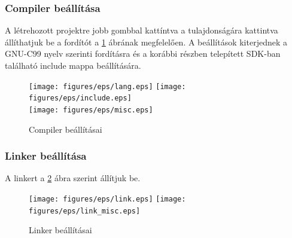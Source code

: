 \subsubsection*{Compiler beállítása}
	A létrehozott projektre jobb gombbal kattíntva a tulajdonságára kattintva állíthatjuk be a fordítót a \ref{fig:compiler} ábrának
	megfelelően.
	A beállítások kiterjednek a GNU-C99 nyelv szerinti fordításra és a korábbi részben telepített SDK-ban található include mappa
	beállítására.
	\begin{figure}[!h]
	\centering
		\texttt{[image: figures/eps/lang.eps]}\hspace{1cm}
		\texttt{[image: figures/eps/include.eps]}\\\vspace{5mm}
		\texttt{[image: figures/eps/misc.eps]}
	\caption{Compiler beállításai} 
	\label{fig:compiler}
	\end{figure}

\subsubsection*{Linker beállítása}
	A linkert a \ref{fig:linker} ábra szerint állítjuk be.
	\begin{figure}[!h]
	\centering
		\texttt{[image: figures/eps/link.eps]}\hspace{1cm}
		\texttt{[image: figures/eps/link\_misc.eps]}\\\vspace{5mm}
	\caption{Linker beállításai} 
	\label{fig:linker}
	\end{figure}

